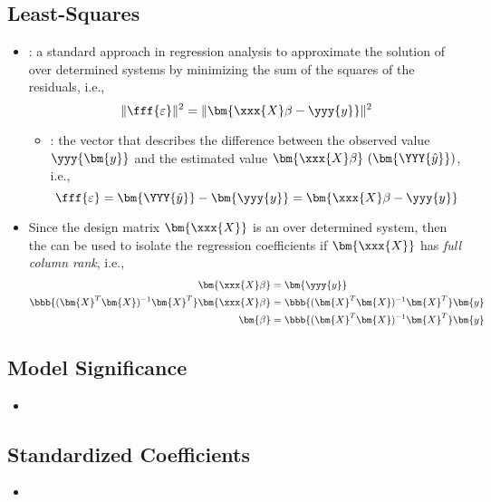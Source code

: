 \begin{itemize}
  \subsection{Least-Squares}
  \begin{itemize}
    \item {}: a standard approach in regression analysis to approximate the solution of over determined systems by minimizing the sum of the squares of the residuals, i.e.,
    \[%
    \| \fff{\varepsilon} \|^2 = \| \bm{\xxx{X}\beta - \yyy{y}}\|^2
    \]%
    \begin{itemize}
      \item {}: the vector that describes the difference{} between the observed value~\(\yyy{\bm{y}}\) and the estimated value \(\bm{\xxx{X}\beta}~(\bm{\YYY{\hat{y}}})\), i.e.,
      \[%
      \fff{\varepsilon} = \bm{\YYY{\hat{y}}} - \bm{\yyy{y}} = \bm{\xxx{X}\beta - \yyy{y}}
      \]%
    \end{itemize}
  \item Since the design matrix \(\bm{\xxx{X}}\) is an over determined system, then the  can be used to isolate the regression coefficients if \(\bm{\xxx{X}}\) has \emph{full column rank}, i.e.,
  \begin{align*}
    \bm{\xxx{X}\beta} &= \bm{\yyy{y}} \\
    \bbb{(\bm{X}^T \bm{X})^{-1} \bm{X}^T} \bm{\xxx{X}\beta} &= \bbb{(\bm{X}^T \bm{X})^{-1} \bm{X}^T} \bm{y} \\
    \bm{\beta} &= \bbb{(\bm{X}^T \bm{X})^{-1} \bm{X}^T} \bm{y}
  \end{align*}
  \end{itemize}

  \subsection{Model Significance}
  \begin{itemize}
    \item 
  \end{itemize}

  \subsection{Standardized Coefficients}
  \begin{itemize}
    \item 
  \end{itemize}
  
\end{itemize}

